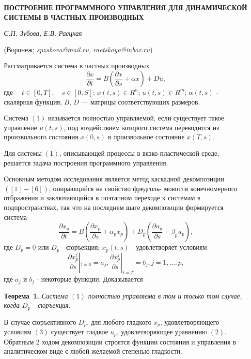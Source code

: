 \begin{center}
    {\bf ПОСТРОЕНИЕ ПРОГРАММНОГО УПРАВЛЕНИЯ ДЛЯ ДИНАМИЧЕСКОЙ СИСТЕМЫ В ЧАСТНЫХ ПРОИЗВОДНЫХ}

    {\it С.П. Зубова, Е.В. Раецкая}

    (Воронеж; {\it spzubova@mail.ru, \it raetskaya@inbox.ru})

\end{center}


 Рассматривается система в частных производных
\begin{equation}
\frac{\partial x}{\partial t}=B(\frac{\partial x}{\partial s}+ \alpha x) + Du,
\end{equation}
 где $\quad t\in [0,T],\quad s\in [0,S]$; $x(t,s)\in R ^{n}$; $u(t,s)\in R^{m}$; $\alpha(t,s)$ - скалярная функция; $B$, $D$ --- матрицы соответствующих размеров.

Система $(1)$ называется полностью управляемой, если существует такое управление $u(t,s)$,
под воздействием которого система переводится  из произвольного состояния $x(0,s)$ в произвольное состояние $x(T,s)$.

Для системы $(1)$, описывающей процессы в вязко-пластической среде, решается задача построения программного управления.


Основным методом исследования является метод каскадной декомпозиции $([1]-[6])$, опирающийся на свойство фредголь-
мовости конечномерного отбражения и заключающийся в поэтапном переходе к системам в подпространствах, так что на
последнем шаге декомпозиции формируется система
\begin{equation}
\frac{\partial x_{p}}{\partial t}=B(\frac{\partial x_{p}}{\partial s}+ \alpha_{p} x_{p}) + D_{p}(\frac{\partial u_{p}}{\partial s}+ \beta_{p} u_{p}),
\end{equation}
где $D_{p}=0$ или $D_{p}$ - сюръекция; $x_{p}(t,s)$ - удовлетворяет условиям
\begin{equation}
\frac{\partial x^{j}_{p}}{\partial s}|_{t=0} = a_{j}, \frac{\partial x^{j}_{p}}{\partial s}|_{t=T} = b_{j}, j=1,...,p,
\end{equation}
где $a_{j}$ и $b_{j}$ - некоторые функции. Доказывается

\textbf{Теорема~1.} {\it Система $(1)$ полностью управляема в том и только том случае, когда $D_{p}$ - сюръекция.}


В случае сюръективного $D_{p}$, для любого гладкого $x_{p}$, удовлетворяющего
условиям $(3)$ существует гладкое $u_{p}$, удовлетворяющее уравнению $(2)$. Обратным 2 ходом декомпозиции строятся функции состояния
и управления в аналитическом виде  с любой желаемой степенью гладкости.

